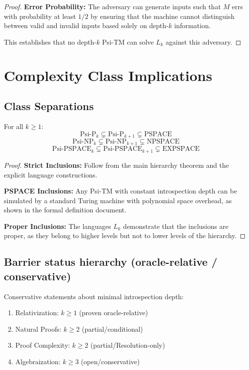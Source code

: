 \begin{proof}
\textbf{Error Probability:}
The adversary can generate inputs such that $M$ errs with probability at least $1/2$ by ensuring that the machine cannot distinguish between valid and invalid inputs based solely on depth-$k$ information.

This establishes that no depth-$k$ Psi-TM can solve $L_k$ against this adversary.
\end{proof}

\section{Complexity Class Implications}

\subsection{Class Separations}

\begin{theorem}
For all $k \geq 1$:
$$\text{Psi-P}_k \subsetneq \text{Psi-P}_{k+1} \subsetneq \text{PSPACE}$$
$$\text{Psi-NP}_k \subsetneq \text{Psi-NP}_{k+1} \subsetneq \text{NPSPACE}$$
$$\text{Psi-PSPACE}_k \subsetneq \text{Psi-PSPACE}_{k+1} \subsetneq \text{EXPSPACE}$$
\end{theorem}

\begin{proof}
\textbf{Strict Inclusions:}
Follow from the main hierarchy theorem and the explicit language constructions.

\textbf{PSPACE Inclusions:}
Any Psi-TM with constant introspection depth can be simulated by a standard Turing machine with polynomial space overhead, as shown in the formal definition document.

\textbf{Proper Inclusions:}
The languages $L_k$ demonstrate that the inclusions are proper, as they belong to higher levels but not to lower levels of the hierarchy.
\end{proof}

\subsection{Barrier status hierarchy (oracle-relative / conservative)}

\begin{theorem}
Conservative statements about minimal introspection depth:
\begin{enumerate}
\item Relativization: $k \geq 1$ (proven oracle-relative)
\item Natural Proofs: $k \geq 2$ (partial/conditional)
\item Proof Complexity: $k \geq 2$ (partial/Resolution-only)
\item Algebraization: $k \geq 3$ (open/conservative)
\end{enumerate}
\end{theorem}

